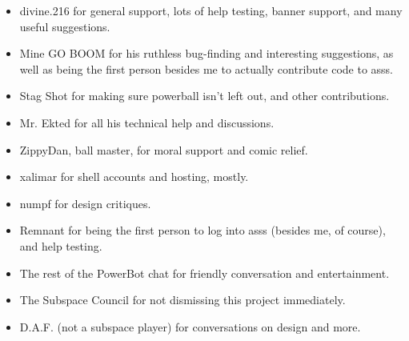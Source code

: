 \documentclass{article}
\newcommand{\asss}{asss}
\begin{document}
\begin{itemize}

\item{divine.216} for general support, lots of help testing, banner
support, and many useful suggestions.

\item{Mine GO BOOM} for his ruthless bug-finding and interesting
suggestions, as well as being the first person besides me to actually
contribute code to \asss{}.

\item{Stag Shot} for making sure powerball isn't left out, and other
contributions.

\item{Mr. Ekted} for all his technical help and discussions.

\item{ZippyDan}, ball master, for moral support and comic relief.

\item{xalimar} for shell accounts and hosting, mostly.

\item{numpf} for design critiques. %

\item{Remnant} for being the first person to log into \asss{} (besides
me, of course), and help testing.

\item{The rest of the PowerBot chat} for friendly conversation and
entertainment.

\item{The Subspace Council} for not dismissing this project immediately.


\item{D.A.F. (not a subspace player)} for conversations on design and
more.

\end{itemize}
\end{document}
